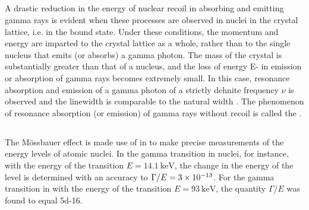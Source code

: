 \subsection{}\label{42.8.3} A drastic reduction in the energy of nuclear recoil in absorbing and emitting gamma rays is evident when these processes are observed in nuclei in the crystal lattice, i.e. in the bound state. Under these conditions, the momentum and energy are imparted to the crystal lattice as a whole, rather than to the single nucleus that emits (or absorbs) a gamma photon. The mass of the crystal is substantially greater than that of a nucleus,
and the loss of energy E- in emission or absorption of gamma
rays becomes extremely small. In this case, resonance absorption and emission of a gamma photon of a strictly dehnite frequency $\nu$ is observed and the linewidth is comparable to the natural width . The phenomenon of resonance absorption (or emission) of gamma rays without recoil is called the .

\subsection{}\label{42.8.4} The M\"ossbauer effect is made use of in  to make precise measurements of the energy levels of atomic nuclei. In the gamma transition in  nuclei, for instance,
with the energy of the transition $E = \SI{14.1}{\keV}$, the change in the energy of the level is determined with an accuracy to $\Gamma/E = \num{3d-13}$. For the gamma transition in  with the energy of the transition $E = \SI{93}{\keV}$, the quantity $\Gamma/E$ was found to
equal \num{5d-16}.


